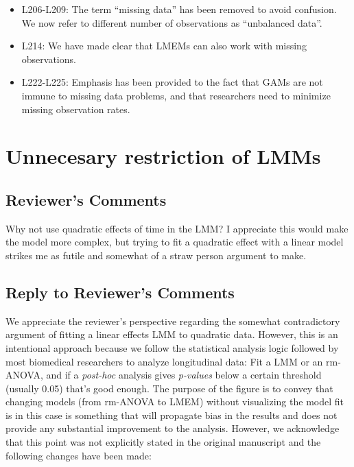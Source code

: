 \documentclass[
]{article}
\begin{document}
\begin{itemize}
\item
  L206-L209: The term ``missing data'' has been removed to avoid confusion. We now refer to different number of observations as ``unbalanced data''.
\item
  L214: We have made clear that LMEMs can also work with missing observations.
\item
  L222-L225: Emphasis has been provided to the fact that GAMs are not immune to missing data problems, and that researchers need to minimize missing observation rates.
\end{itemize}

\hypertarget{unnecesary-restriction-of-lmms}{%
\section{Unnecesary restriction of LMMs}\label{unnecesary-restriction-of-lmms}}

\hypertarget{reviewers-comments-1}{%
\subsection{Reviewer's Comments}\label{reviewers-comments-1}}

Why not use quadratic effects of time in the LMM? I appreciate this would make the model more complex, but trying to fit a quadratic effect with a linear model strikes me as futile and somewhat of a straw person argument to make.

\hypertarget{section-2}{%
\subsection{\texorpdfstring{\textcolor{reviewersblue} {Reply to Reviewer's Comments}}{}}\label{section-2}}

We appreciate the reviewer's perspective regarding the somewhat contradictory argument of fitting a linear effects LMM to quadratic data. However, this is an intentional approach because we follow the statistical analysis logic followed by most biomedical researchers to analyze longitudinal data: Fit a LMM or an rm-ANOVA, and if a \emph{post-hoc} analysis gives \emph{p-values} below a certain threshold (usually 0.05) that's good enough. The purpose of the figure is to convey that changing models (from rm-ANOVA to LMEM) without visualizing the model fit is in this case is something that will propagate bias in the results and does not provide any substantial improvement to the analysis. However, we acknowledge that this point was not explicitly stated in the original manuscript and the following changes have been made:
\end{document}

